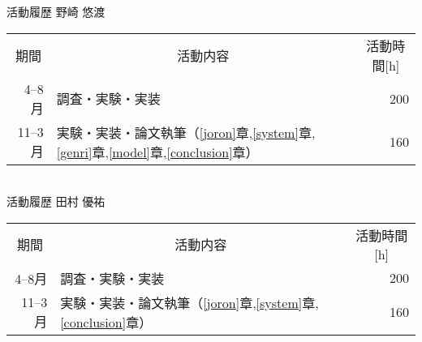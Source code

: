 

\thispagestyle{empty}

\begin{table}[tbp]
\large
\centering


	

{\gtfamily 活動履歴} 野崎 悠渡\\
\begin{tabular}{rlr}
\hline
\multicolumn{1}{c}{{\gtfamily 期間}}&
\multicolumn{1}{c}{{\gtfamily 活動内容}}&
\multicolumn{1}{c}{{\gtfamily 活動時間[h]}}
\\
4--8月 & 調査・実験・実装 & 200 \\
11--3月 & 実験・実装・論文執筆（\ref{joron}章,\ref{system}章,\ref{genri}章,\ref{model}章,\ref{conclusion}章） & 160\\
\hline
\end{tabular}\\
\vspace{2in}
{\gtfamily 活動履歴} 田村 優祐\\
\begin{tabular}{rlr}
\hline
\multicolumn{1}{c}{{\gtfamily 期間}}&
\multicolumn{1}{c}{{\gtfamily 活動内容}}&
\multicolumn{1}{c}{{\gtfamily 活動時間[h]}}
\\
4--8月 & 調査・実験・実装 & 200 \\
11--3月 & 実験・実装・論文執筆（\ref{joron}章,\ref{system}章,\ref{conclusion}章） & 160\\
\hline
\end{tabular}\\

\end{table}
\clearpage

